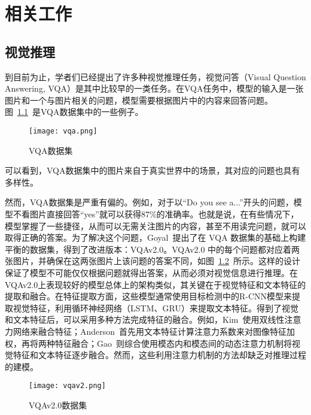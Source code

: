 
\chapter{相关工作}\label{cha:related_work}
\section{视觉推理}\label{sec:visural_reasoning}
到目前为止，学者们已经提出了许多种视觉推理任务，视觉问答（Visual Question Answering, VQA）\cite{antol2015vqa}是其中比较早的一类任务。在VQA任务中，模型的输入是一张图片和一个与图片相关的问题，模型需要根据图片中的内容来回答问题。图~\ref{fig:vqa}~是VQA数据集\cite{antol2015vqa}中的一些例子。
\begin{figure}[!b]
    \texttt{[image: vqa.png]}
    \caption{VQA数据集\cite{antol2015vqa}}
    \label{fig:vqa}
\end{figure}
可以看到，VQA数据集中的图片来自于真实世界中的场景，其对应的问题也具有多样性。

然而，VQA\cite{antol2015vqa}数据集是严重有偏的。例如，对于以``Do you see
a...''开头的问题，模型不看图片直接回答``yes''就可以获得87\%的准确率\cite{goyal2017making}。也就是说，在有些情况下，模型掌握了一些捷径，从而可以无需关注图片的内容，甚至不用读完问题，就可以取得正确的答案。为了解决这个问题，Goyal~\etal\cite{goyal2017making}提出了在 VQA 数据集的基础上构建平衡的数据集，得到了改进版本：VQAv2.0。VQAv2.0 中的每个问题都对应着两张图片，并确保在这两张图片上该问题的答案不同，如图~\ref{fig:vqav2}~所示。这样的设计保证了模型不可能仅仅根据问题就得出答案，从而必须对视觉信息进行推理。在VQAv2.0上表现较好的模型总体上的架构类似\cite{kim2018bilinear,anderson2018bottom,gao2019dynamic}，其关键在于视觉特征和文本特征的提取和融合。在特征提取方面，这些模型通常使用目标检测中的R-CNN\cite{ren2015faster}模型来提取视觉特征，利用循环神经网络（LSTM\cite{hochreiter1997long}、GRU\cite{cho2014learning}）来提取文本特征。得到了视觉和文本特征后，可以采用多种方法完成特征的融合。例如，Kim~\etal\cite{kim2018bilinear}使用双线性注意力网络来融合特征；Anderson~\etal\cite{anderson2018bottom}首先用文本特征计算注意力系数来对图像特征加权，再将两种特征融合；Gao~\etal\cite{gao2019dynamic}则综合使用模态内和模态间的动态注意力机制将视觉特征和文本特征逐步融合。然而，这些利用注意力机制的方法却缺乏对推理过程的建模。

\begin{figure}
    \texttt{[image: vqav2.png]}
    \caption{VQAv2.0数据集\cite{goyal2017making}}
    \label{fig:vqav2}
\end{figure}

